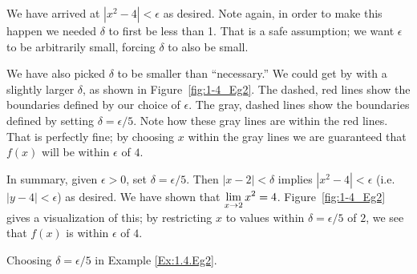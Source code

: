 \begin{example}
We have arrived at $|x^2 - 4|<\epsilon$ as desired.  Note again, in order to make this happen we needed $\delta$ to first be less than 1.  That is a safe assumption; we want $\epsilon$ to be arbitrarily small, forcing $\delta$ to also be small. 

We have also picked $\delta$ to be smaller than ``necessary.'' We could get by with a slightly larger $\delta$, as shown in Figure~\ref{fig:1-4_Eg2}. The dashed, red lines show the boundaries defined by our choice of $\epsilon$. The gray, dashed lines show the boundaries defined by setting $\delta = \epsilon/5$. Note how these gray lines are within the red lines. That is perfectly fine; by choosing $x$ within the gray lines we are guaranteed that $f(x)$ will be within $\epsilon$ of $4$.%

In summary, given $\epsilon > 0$, set $\delta=\epsilon/5$.  Then $|x - 2| < \delta$ implies 
$|x^2 - 4|< \epsilon$ (i.e. $|y - 4|< \epsilon$) as desired.  We have shown that $\displaystyle \lim_{x\rightarrow 2} x^2 = 4 $. Figure~\ref{fig:1-4_Eg2} gives a visualization of this; by restricting $x$ to values within $\delta = \epsilon/5$ of $2$, we see that $f(x)$ is within $\epsilon$ of $4$.
\end{example}

\begin{marginfigure}[-8cm]
\caption{Choosing $\delta = \epsilon/5$ in Example \ref{Ex:1.4.Eg2}.}\label{fig:1-4_Eg2}
\end{marginfigure}